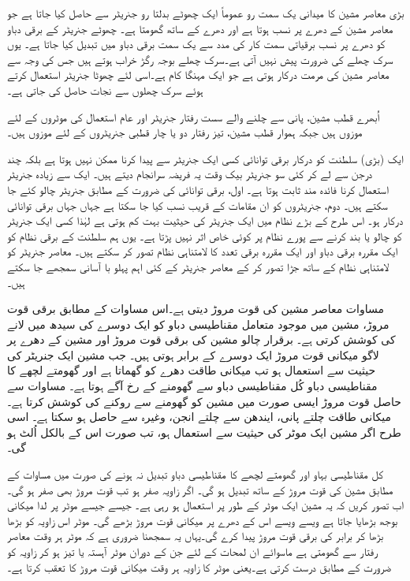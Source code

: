 بڑی معاصر مشین کا میدانی یک سمت  رو عموماً  ایک چھوٹے بدلتا رو جنریٹر سے حاصل کیا جاتا ہے جو معاصر مشین کے دھرے پر  نسب ہوتا ہے اور دھرے  کے ساتھ  گھومتا ہے۔ چھوٹے جنریٹر کے برقی دباو کو دھرے پر  نسب برقیاتی سمت کار کی مدد سے یک سمت  برقی دباو میں تبدیل کیا جاتا ہے۔ یوں سرک چھلے کی ضرورت پیش نہیں آتی ہے۔سرک چھلے بوجہ  رگڑ خراب ہوتے ہیں جس کی وجہ سے معاصر مشین کی مرمت درکار ہوتی ہے جو  ایک مہنگا کام ہے۔اسی لئے چھوٹا  جنریٹر استعمال کرتے ہوئے سرک چھلوں سے نجات حاصل کی جاتی ہے۔

اُبھرے قطب مشین، پانی سے چلنے والے سست رفتار جنریٹر اور  عام استعمال کی موٹروں کے لئے موزوں  ہیں جبکہ ہموار قطب مشین، تیز رفتار دو یا چار قطبی  جنریٹروں کے لئے موزوں  ہیں۔

ایک (بڑی) سلطنت کو درکار برقی توانائی  کسی ایک  جنریٹر سے پیدا کرنا ممکن نہیں ہوتا ہے بلکہ چند درجن سے لے کر کئی سو  جنریٹر بیک وقت یہ فریضہ سرانجام دیتے  ہیں۔ ایک سے زیادہ جنریٹر استعمال کرنا فائدہ مند ثابت ہوتا ہے۔ اول، برقی توانائی کی ضرورت کے مطابق جنریٹر چالو کئے جا سکتے ہیں۔ دوم،  جنریٹروں کو ان مقامات کے قریب نسب کیا جا سکتا ہے جہاں جہاں برقی توانائی درکار ہو۔ اس طرح کے بڑے نظام میں ایک جنریٹر کی حیثیت بہت کم ہوتی ہے لہٰذا کسی ایک جنریٹر کو چالو یا بند کرنے سے پورے نظام پر کوئی خاص اثر نہیں پڑتا ہے۔ یوں ہم سلطنت کے برقی نظام کو ایک مقررہ برقی دباو اور ایک مقررہ برقی تعدد کا لامتناہی نظام تصور کر سکتے ہیں۔ معاصر جنریٹر کو لامتناہی نظام کے ساتھ جڑا تصور کر کے معاصر جنریٹر کے کئی اہم پہلو با آسانی سمجھے جا سکتے ہیں۔

مساوات    معاصر مشین کی قوت مروڑ دیتی ہے۔اس مساوات کے مطابق برقی قوت مروڑ، مشین میں موجود متعامل مقناطیسی دباو کو ایک دوسرے کی سیدھ میں لانے کی کوشش کرتی ہے۔ برقرار  چالو  مشین کی  برقی قوت مروڑ اور مشین کے دھرے پر لاگو میکانی قوت مروڑ ایک دوسرے کے برابر ہوتی ہیں۔ جب مشین ایک جنریٹر کی حیثیت سے استعمال ہو تب میکانی طاقت  دھرے کو گھماتا ہے اور گھومتے لچھے کا مقناطیسی دباو کُل مقناطیسی دباو سے گھومنے کے رخ  آگے ہوتا ہے۔ مساوات  سے حاصل قوت مروڑ ایسی صورت میں مشین کو گھومنے سے روکنے کی کوشش کرتا ہے۔میکانی طاقت چلتے پانی، ایندھن سے چلتے انجن، وغیرہ سے حاصل ہو سکتا ہے۔ اسی طرح اگر مشین ایک موٹر کی حیثیت سے استعمال ہو، تب صورت اس کے بالکل اُلٹ ہو گی۔

کل مقناطیسی بہاو   اور گھومتے لچھے کا مقناطیسی دباو  تبدیل نہ ہونے کی صورت میں  مساوات  کے مطابق مشین کی قوت مروڑ   کے ساتھ تبدیل ہو گی۔ اگر زاویہ  صفر ہو تب  قوت مروڑ بھی صفر ہو گی۔ اب  تصور کریں کہ یہ مشین ایک موٹر کے طور پر استعمال ہو رہی ہے۔ جیسے جیسے موٹر پر لدا میکانی بوجھ بڑھایا جاتا ہے ویسے ویسے اس کے دھرے پر میکانی قوت مروڑ بڑھے گی۔ موٹر اس زاویہ کو بڑھا بڑھا کر برابر کی برقی قوت مروڑ پیدا کرے گی۔یہاں یہ سمجھنا ضروری ہے کہ موٹر ہر وقت معاصر رفتار سے گھومتی ہے ماسوائے ان لمحات کے لئے جن کے دوران موٹر آہستہ یا تیز  ہو کر زاویہ کو ضرورت کے مطابق درست کرتی ہے۔یعنی موٹر کا زاویہ  ہر وقت میکانی قوت مروڑ کا تعقب  کرتا ہے۔

